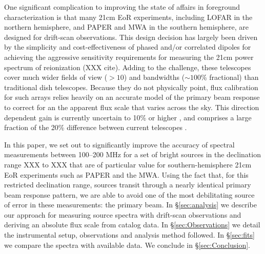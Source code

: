 \documentclass[preprint]{aastex}
\begin{document}
One significant complication to improving the state of affairs in foreground characterization
is that many 21cm EoR experiments, including LOFAR in the northern hemisphere, and
PAPER and MWA in the southern hemisphere, are designed for drift-scan observations.
This design decision has largely been driven by the simplicity and cost-effectiveness of
phased and/or correlated dipoles for achieving the aggressive sensitivity requirements
for measuring the 21cm power spectrum of reionization (XXX cite).
Adding to the challenge, these telescopes 
cover much wider fields of view ($>10$\arcdeg) and bandwidths
($\sim 100$\% fractional) than traditional dish telescopes.
Because they do not physically point, flux calibration for such arrays relies heavily
on an accurate model of the primary beam response to correct for an
the apparent flux scale that varies across the sky.
This direction dependent gain is currently uncertain to 10\% or higher
\citep{Pober:2012p8800}, and comprises a large fraction of the 20\% difference between current telescopes \citep{Jacobs:2013p9713}.

In this paper, we set out to significantly improve the accuracy of spectral measurements between 
100--200 MHz for a set of bright sources in the declination range XXX to XXX that
are of particular value for southern-hemisphere 21cm EoR experiments such as PAPER and the MWA.
Using the fact that, for this restricted declination range,
sources transit through a nearly identical primary beam response pattern, we are able to avoid one of the
most debilitating source of error in these measurements: the primary beam.  
In \S\ref{sec:analysis} we describe our approach for measuring source spectra with
drift-scan observations and deriving an absolute flux scale from catalog data.  
In \S\ref{sec:Observations} we detail the instrumental 
setup, observations and analysis method followed. In \S\ref{sec:fits} we
compare the spectra with available data.  We conclude in 
\S\ref{sec:Conclusion}.


\end{document}
